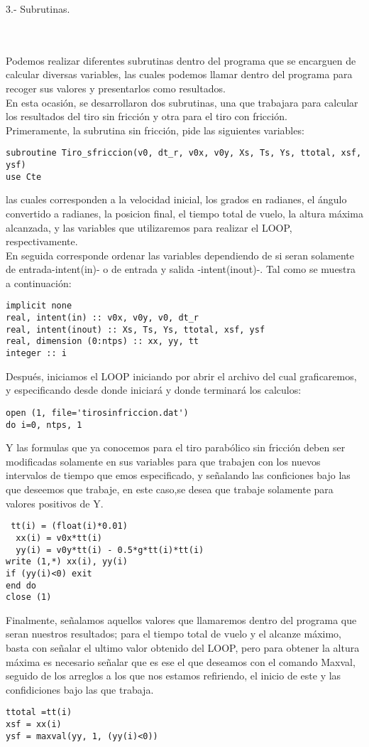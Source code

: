 \documentclass[12pt]{article}
\begin{document}
\begin{large}
3.- Subrutinas.
\end{large}\\
\\
Podemos realizar diferentes subrutinas dentro del programa que se encarguen de calcular diversas variables, las cuales podemos llamar dentro del programa para recoger sus valores y presentarlos como resultados.\\
En esta ocasión, se desarrollaron dos subrutinas, una que trabajara para calcular los resultados del tiro sin fricción y otra para el tiro con fricción.\\
Primeramente, la subrutina sin fricción, pide las siguientes variables:
\begin{verbatim}
subroutine Tiro_sfriccion(v0, dt_r, v0x, v0y, Xs, Ts, Ys, ttotal, xsf, ysf)
use Cte
\end{verbatim}
las cuales corresponden a la velocidad inicial, los grados en radianes, el ángulo convertido a radianes, la posicion final, el tiempo total de vuelo, la altura máxima alcanzada, y las variables que utilizaremos para realizar el LOOP, respectivamente.\\
En seguida corresponde ordenar las variables dependiendo de si seran solamente de entrada-intent(in)- o de entrada y salida -intent(inout)-. Tal como se muestra a continuación:
\begin{verbatim}
implicit none
real, intent(in) :: v0x, v0y, v0, dt_r
real, intent(inout) :: Xs, Ts, Ys, ttotal, xsf, ysf
real, dimension (0:ntps) :: xx, yy, tt
integer :: i
\end{verbatim}
Después, iniciamos el LOOP iniciando por abrir el archivo del cual graficaremos, y especificando desde donde iniciará y donde terminará los calculos:
\begin{verbatim}
open (1, file='tirosinfriccion.dat')
do i=0, ntps, 1
\end{verbatim}
Y las formulas que ya conocemos para el tiro parabólico sin fricción deben ser modificadas solamente en sus variables para que trabajen con los nuevos intervalos de tiempo que emos especificado, y señalando las conficiones bajo las que deseemos que trabaje, en este caso,se desea que trabaje solamente para valores positivos de Y.
\begin{verbatim}
 tt(i) = (float(i)*0.01)
  xx(i) = v0x*tt(i) 
  yy(i) = v0y*tt(i) - 0.5*g*tt(i)*tt(i)
write (1,*) xx(i), yy(i)
if (yy(i)<0) exit
end do
close (1)
\end{verbatim}
Finalmente, señalamos aquellos valores que llamaremos dentro del programa que seran nuestros resultados; para el tiempo total de vuelo y el alcanze máximo, basta con señalar el ultimo valor obtenido del LOOP, pero para obtener la altura máxima es necesario señalar que es ese el que deseamos con el comando Maxval, seguido de los arreglos a los que nos estamos refiriendo, el inicio de este y las confidiciones bajo las que trabaja.
\begin{verbatim}
ttotal =tt(i)
xsf = xx(i)
ysf = maxval(yy, 1, (yy(i)<0))
\end{verbatim}
\end{document}
